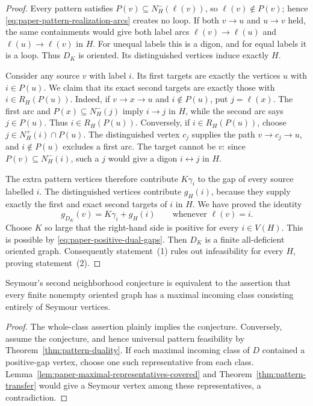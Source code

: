 \begin{proof}
Every pattern satisfies $P(v)\subseteq N_H^-(\ell(v))$, so
$\ell(v)\notin P(v)$; hence \eqref{eq:paper-pattern-realization-arcs}
creates no loop. If both $v\to u$ and $u\to v$ held, the same
containments would give both label arcs $\ell(v)\to\ell(u)$ and
$\ell(u)\to\ell(v)$ in $H$. For unequal labels this is a digon,
and for equal labels it is a loop. Thus $D_K$ is oriented. Its
distinguished vertices induce exactly $H$.

Consider any source $v$ with label $i$. Its first targets are exactly
the vertices $u$ with $i\in P(u)$. We claim that its exact second
targets are exactly those with $i\in R_H(P(u))$. Indeed, if
$v\to x\to u$ and $i\notin P(u)$, put $j=\ell(x)$. The first
arc and $P(x)\subseteq N_H^-(j)$ imply $i\to j$ in $H$, while
the second arc says $j\in P(u)$. Thus $i\in R_H(P(u))$.
Conversely, if $i\in R_H(P(u))$, choose
$j\in N_H^+(i)\cap P(u)$. The distinguished vertex $c_j$ supplies
the path $v\to c_j\to u$, and $i\notin P(u)$ excludes a first
arc. The target cannot be $v$: since
$P(v)\subseteq N_H^-(i)$, such a $j$ would give a digon $i\leftrightarrow j$
in $H$.

The extra pattern vertices therefore contribute $K\gamma_i$ to the
gap of every source labelled $i$. The distinguished vertices contribute
$g_H(i)$, because they supply exactly the first and exact second
targets of $i$ in $H$. We have proved the identity
\begin{equation}
 g_{D_K}(v)=K\gamma_i+g_H(i)
                    \qquad\text{whenever }\ell(v)=i.
 \label{eq:paper-realization-gap}
\end{equation}
Choose $K$ so large that the right-hand side is positive for every
$i\in V(H)$. This is possible by
\eqref{eq:paper-positive-dual-gaps}. Then $D_K$ is a finite
all-deficient oriented graph. Consequently statement~(1) rules out
infeasibility for every $H$, proving statement~(2).
\end{proof}

\begin{corollary}
\label{cor:paper-whole-class-equivalence}
Seymour's second neighborhood conjecture is equivalent to the assertion
that every finite nonempty oriented graph has a maximal incoming class
consisting entirely of Seymour vertices.
\end{corollary}
\begin{proof}
The whole-class assertion plainly implies the conjecture. Conversely,
assume the conjecture, and hence universal pattern feasibility by
Theorem~\ref{thm:pattern-duality}. If each maximal incoming class of
$D$ contained a positive-gap vertex, choose one such representative
from each class. Lemma~\ref{lem:paper-maximal-representatives-covered}
and Theorem~\ref{thm:pattern-transfer} would give a Seymour vertex
among these representatives, a contradiction.
\end{proof}

